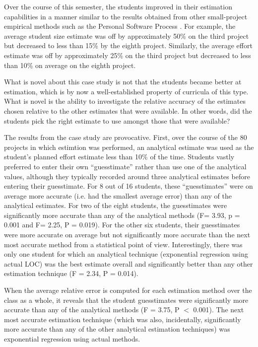 Over the course of this semester, the students improved in their estimation 
capabilities in a manner similar to the results obtained from other
small-project empirical methods such as the Personal Software Process
\cite{Hayes97,Emam96,Ferguson97,csdl-98-13}.  For
example, the average student size estimate was off by approximately 50\% on
the third project but decreased to less than 15\% by the eighth project.
Similarly, the average effort estimate was off by approximately 25\% on the
third project but decreased to less than 10\% on average on the eighth
project. 

What is novel about this case study is not that the students became
better at estimation, which is by now a well-established property of
curricula of this type.  What is novel is the ability to investigate
the relative accuracy of the estimates chosen relative to the other
estimates that were available.  In other words, did the students pick the
right estimate to use amongst those that were available?  

The results from the case study are provocative.  First, over the course of
the 80 projects in which estimtion was performed, an analytical estimate
was used as the student's planned effort estimate less than 10\% of the
time. Students vastly preferred to enter their own ``guesstimate'' rather
than use one of the analytical values, although they typically recorded
around three analytical estimates before entering their guesstimate.  For 8
out of 16 students, these ``guesstimates'' were on average more accurate
(i.e.  had the smallest average error) than any of the analytical
estimates. For two of the eight students, the guesstimates were
significantly more accurate than any of the analytical methods (F= 3.93, p
= 0.001 and F= 2.25, P = 0.019). For the other six students, their
guesstimates were more accurate on average but not significantly more
accurate than the next most accurate method from a
statistical point of view.  Interestingly, there was only one student for which
an analytical technique (exponential regression using actual LOC) was the
best estimate overall and significantly better than any other estimation
technique (F = 2.34, P = 0.014).

When the average relative error is computed for each estimation method over
the class as a whole, it reveals that the student guesstimates were
significantly more accurate than any of the analytical methods (F = 3.75, P 
 $<$ 0.001).  The next most accurate estimation technique (which was also,
incidentally, significantly more accurate than any of the other analytical
estimation techniques) was exponential regression using actual
methods. 

